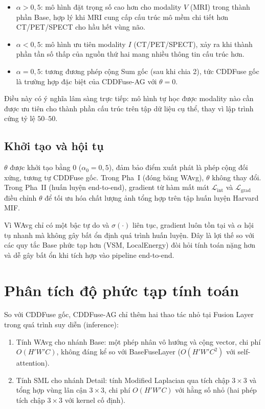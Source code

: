 \begin{itemize}\itemsep2pt
    \item $\alpha > 0{,}5$: mô hình đặt trọng số cao hơn cho modality $V$ (MRI) trong thành phần Base, hợp lý khi MRI cung cấp cấu trúc mô mềm chi tiết hơn CT/PET/SPECT cho hầu hết vùng não.
    \item $\alpha < 0{,}5$: mô hình ưu tiên modality $I$ (CT/PET/SPECT), xảy ra khi thành phần tần số thấp của nguồn thứ hai mang nhiều thông tin cấu trúc hơn.
    \item $\alpha = 0{,}5$: tương đương phép cộng Sum gốc (sau khi chia 2), tức CDDFuse gốc là trường hợp đặc biệt của CDDFuse-AG với $\theta = 0$.
\end{itemize}

Điều này có ý nghĩa lâm sàng trực tiếp: mô hình tự học được modality nào cần được ưu tiên cho thành phần cấu trúc trên tập dữ liệu cụ thể, thay vì lập trình cứng tỷ lệ $50\text{--}50$.

\subsection{Khởi tạo và hội tụ}
\label{ssec:alpha-convergence}

$\theta$ được khởi tạo bằng $0$ ($\alpha_0 = 0{,}5$), đảm bảo điểm xuất phát là phép cộng đối xứng, tương tự CDDFuse gốc. Trong Pha~I (đóng băng WAvg), $\theta$ không thay đổi. Trong Pha~II (huấn luyện end-to-end), gradient từ hàm mất mát $\mathcal{L}_{\mathrm{int}}$ và $\mathcal{L}_{\mathrm{grad}}$ điều chỉnh $\theta$ để tối ưu hóa chất lượng ảnh tổng hợp trên tập huấn luyện Harvard MIF.

Vì WAvg chỉ có một bậc tự do và $\sigma(\cdot)$ liên tục, gradient luôn tồn tại và $\alpha$ hội tụ nhanh mà không gây bất ổn định quá trình huấn luyện. Đây là lợi thế so với các quy tắc Base phức tạp hơn (VSM, LocalEnergy) đòi hỏi tính toán nặng hơn và dễ gây bất ổn khi tích hợp vào pipeline end-to-end.

\section{Phân tích độ phức tạp tính toán}
\label{sec:complexity}

So với CDDFuse gốc, CDDFuse-AG chỉ thêm hai thao tác nhỏ tại Fusion Layer trong quá trình suy diễn (inference):

\begin{enumerate}\itemsep2pt
    \item Tính WAvg cho nhánh Base: một phép nhân vô hướng và cộng vector, chi phí $O(H'W'C)$, không đáng kể so với BaseFuseLayer ($O(H'W'C^2)$ với self-attention).
    \item Tính SML cho nhánh Detail: tính Modified Laplacian qua tích chập $3\times3$ và tổng hợp vùng lân cận $3\times3$, chi phí $O(H'W'C)$ với hằng số nhỏ (hai phép tích chập $3\times3$ với kernel cố định).
\end{enumerate}

